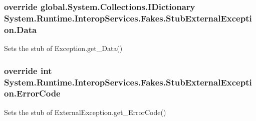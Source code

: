 \hypertarget{class_system_1_1_runtime_1_1_interop_services_1_1_fakes_1_1_stub_external_exception_a94ceae27838579416fcd8b3bc7c9dd5c}{
\subsubsection[{Data}]{\setlength{\rightskip}{0pt plus 5cm}override global.\-System.\-Collections.\-I\-Dictionary System.\-Runtime.\-Interop\-Services.\-Fakes.\-Stub\-External\-Exception.\-Data\hspace{0.3cm}{\ttfamily [get]}}}\label{class_system_1_1_runtime_1_1_interop_services_1_1_fakes_1_1_stub_external_exception_a94ceae27838579416fcd8b3bc7c9dd5c}


Sets the stub of Exception.\-get\-\_\-\-Data()

\hypertarget{class_system_1_1_runtime_1_1_interop_services_1_1_fakes_1_1_stub_external_exception_ae99e9faa65a2b920133a78c427287938}{
\subsubsection[{Error\-Code}]{\setlength{\rightskip}{0pt plus 5cm}override int System.\-Runtime.\-Interop\-Services.\-Fakes.\-Stub\-External\-Exception.\-Error\-Code\hspace{0.3cm}{\ttfamily [get]}}}\label{class_system_1_1_runtime_1_1_interop_services_1_1_fakes_1_1_stub_external_exception_ae99e9faa65a2b920133a78c427287938}


Sets the stub of External\-Exception.\-get\-\_\-\-Error\-Code()

